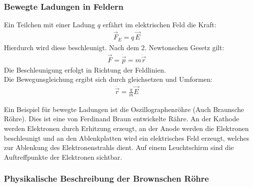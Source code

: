 \documentclass{article}
\begin{document}
\subsubsection{Bewegte Ladungen in Feldern}
Ein Teilchen mit einer Ladung $q$ erfährt im elektrischen Feld die Kraft:
\begin{align}
    \vec{F}_E=q\,\vec{E}
\end{align}
Hierdurch wird diese beschleunigt. Nach dem 2. Newtonschen Gesetz gilt:
\begin{align}
    \vec{F}=\dot{\vec{p}}=m\ddot{\vec{r}}
\end{align}
Die Beschleunigung erfolgt in Richtung der Feldlinien.\\
Die Bewegunsgleichung ergibt sich durch gleichsetzen und Umformen:
\begin{align}
    \ddot{\vec{r}}=\frac{q}{m}\vec{E}
\end{align}
\vspace{0.5cm}

\noindent Ein Beispiel für bewegte Ladungen ist die Oszillographenröhre (Auch Braunsche Röhre).
Dies ist eine von Ferdinand Braun entwickelte Rähre. An der Kathode werden Elektronen 
durch Erhitzung erzeugt, an der Anode werden die Elektronen beschleunigt und an den Ablenkplatten wird ein elektrisches 
Feld erzeugt, welches zur Ablenkung des Elektronenstrahls dient. Auf einem Leuchtschirm sind die Auftreffpunkte 
der Elektronen sichtbar.

\subsubsection*{Physikalische Beschreibung der Brownschen Röhre}
\end{document}
